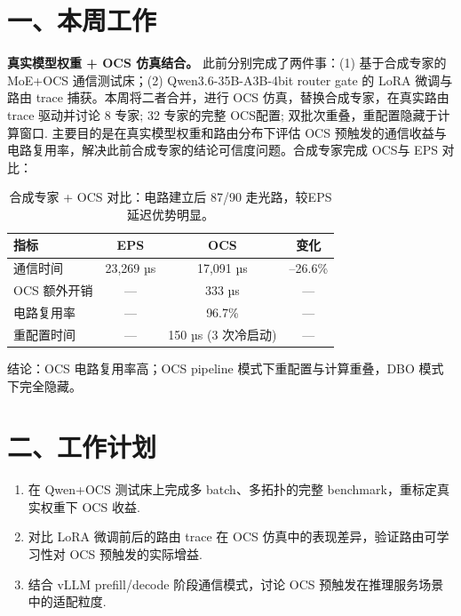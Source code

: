 \documentclass{sjtuweekly}
\begin{document}
\makeweeklytitle   %


\section{一、本周工作}


\textbf{真实模型权重 + OCS 仿真结合。}
此前分别完成了两件事：(1) 基于合成专家的 MoE+OCS 通信测试床；(2) Qwen3.6-35B-A3B-4bit router gate 的 LoRA 微调与路由 trace 捕获。本周将二者合并，进行 OCS 仿真，替换合成专家，在真实路由 trace 驱动并讨论 8 专家; 32 专家的完整 OCS配置; 双批次重叠，重配置隐藏于计算窗口. 主要目的是在真实模型权重和路由分布下评估 OCS 预触发的通信收益与电路复用率，解决此前合成专家的结论可信度问题。合成专家完成 OCS与 EPS 对比：

\begin{table}[htbp]
\centering
\small
\begin{tabular}{lccc}
\toprule
\textbf{指标} & \textbf{EPS} & \textbf{OCS} & \textbf{变化} \\
\midrule
通信时间        & 23,269 µs  & 17,091 µs  & --26.6\% \\
OCS 额外开销    & —          & 333 µs     & — \\
电路复用率      & —          & 96.7\%     & — \\
重配置时间      & —          & 150 µs (3 次冷启动) & — \\
\bottomrule
\end{tabular}
\caption{合成专家 + OCS 对比：电路建立后 87/90 走光路，较EPS 延迟优势明显。}
\label{tab:ocs_eps}
\end{table}

结论：OCS 电路复用率高；OCS pipeline 模式下重配置与计算重叠，DBO 模式下完全隐藏。

\section{二、工作计划}

\begin{enumerate}
  \item 在 Qwen+OCS 测试床上完成多 batch、多拓扑的完整 benchmark，重标定真实权重下 OCS 收益.
  \item 对比 LoRA 微调前后的路由 trace 在 OCS 仿真中的表现差异，验证路由可学习性对 OCS 预触发的实际增益.
  \item 结合 vLLM prefill/decode 阶段通信模式，讨论 OCS 预触发在推理服务场景中的适配粒度.
\end{enumerate}

\printbib
\end{document}
